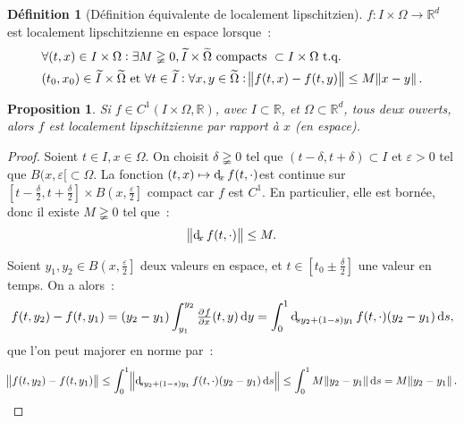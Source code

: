 \documentclass{report}
\newtheorem{prp}[thm]{Proposition}
\theoremstyle{definition}
\newtheorem{déf}[thm]{Définition}
\theoremstyle{remark}
\numberwithin{equation}{section}
\newcommand{\R}{\mathbb R}
\newcommand{\tq}{\text{ t.q. }}
\begin{document}
			\begin{déf}[Définition équivalente de localement lipschitzien] $f : I \times \Omega \to \R^d$ est localement lipschitzienne en espace lorsque~:
			\begin{align}
				&\forall (t, x) \in I \times \Omega : \exists M \gneqq 0, \widetilde I \times \widetilde \Omega \text{ compacts } \subset I \times \Omega \tq \\
				&(t_0, x_0) \in \widetilde I \times \widetilde \Omega \text{ et } \forall t \in \widetilde I : \forall x, y \in \widetilde \Omega :
				\norm {f(t, x) - f(t, y)} \leq M\norm {x-y}.
			\end{align}
			\end{déf}

			\begin{prp}\label{prp:C1=>loclipschitz} Si $f \in C^1(I \times \Omega, \R)$, avec $I \subset \R$, et $\Omega \subset \R^d$, tous deux ouverts,
			alors $f$ est localement lipschitzienne par rapport à $x$ (en espace).
			\end{prp}

			\begin{proof} Soient $t \in I, x \in \Omega$. On choisit $\delta \gneqq 0$ tel que $(t-\delta, t+\delta) \subset I$ et $\varepsilon > 0$ tel que
			$B(x, \varepsilon[ \subset \Omega$. La fonction $(t, x) \mapsto \dif_xf(t, \cdot)$\footnotemark est continue sur
			$\left[t-\frac \delta2, t+\frac \delta2\right] \times B\left(x, \frac \varepsilon2\right]$ compact car $f$ est $C^1$. En particulier, elle est bornée,
			donc il existe $M \gneqq 0$ tel que~:
			\begin{equation}
				\norm {\dif_xf(t, \cdot)} \leq M.
			\end{equation}

			Soient $y_1, y_2 \in B\left(x, \frac \varepsilon2\right]$ deux valeurs en espace, et $t \in \left[t_0 \pm \frac \delta2\right]$ une valeur en temps.
			On a alors~:
			\begin{equation}
				f(t, y_2) - f(t, y_1) = (y_2-y_1)\int_{y_1}^{y_2}\pd fx(t, y)\dif y = \int_0^1\dif_{sy_2 + (1-s)y_1}f(t, \cdot)(y_2-y_1)\dif s,
			\end{equation}
			que l'on peut majorer en norme par~:
			\begin{equation}
				\norm {f(t, y_2) - f(t, y_1)} \leq \int_0^1\norm {\dif_{sy_2 + (1-s)y_1}f(t, \cdot)(y_2-y_1)\dif s} \leq \int_0^1M\norm {y_2-y_1}\dif s
				= M\norm {y_2-y_1}.
			\end{equation}
			\end{proof}		
\end{document}
